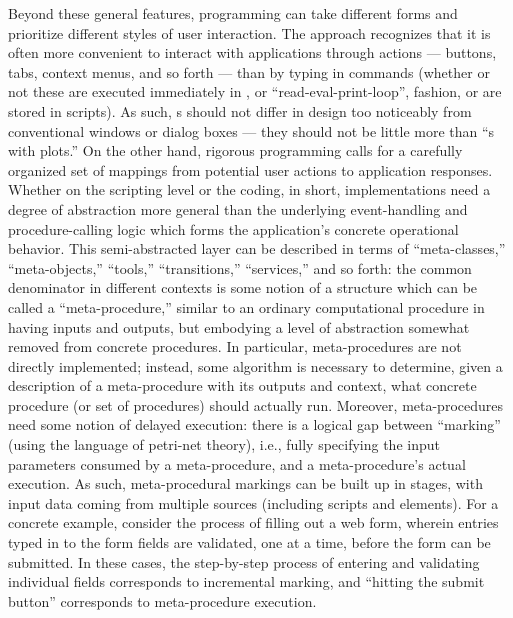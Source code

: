 \documentclass[11pt,letterpaper]{article}
\newcommand{\ATextCClr}[1]{\textcolor{atcColor}{\textbf{#1}}}
\newcommand{\IDN}{\resizebox{!}{7pt}{\AcronymText{IDN}}}
\newcommand{\REPL}{\resizebox{!}{7pt}{\AcronymText{REPL}}}
\newcommand{\MdsX}{\resizebox{!}{7.5pt}{\ATextCClr{MdsX}}}
\newcommand{\GUI}{\resizebox{!}{7pt}{\AcronymText{GUI}}}
\newcommand{\textscc}[1]{{\color{orr!35!black}{{%
						\fontfamily{Cabin-TLF}\fontseries{b}\selectfont{\textsc{\scriptsize{#1}}}}}}}
\newcommand{\AcronymText}[1]{{\textscc{#1}}}
\newcommand{\p}[1]{

\vspace{1em}#1}
\newcommand{\q}[1]{{\fontfamily{qcr}\selectfont ``}#1{\fontfamily{qcr}\selectfont ''}}
\begin{document}
{\p{Beyond these general features, \IDN{} 
programming can take different forms and 
prioritize different styles of user 
interaction.  The \MdsX{} approach recognizes 
that it is often more convenient to 
interact with applications through 
\GUI{} actions --- buttons, tabs, context 
menus, and so forth --- than by typing 
in commands (whether or not these are 
executed immediately in \REPL{}, or 
\q{read-eval-print-loop}, fashion, or are 
stored in scripts).  As such, \IDN{}s 
should not differ in design too noticeably 
from conventional \GUI{} windows or dialog 
boxes --- they should not be little more 
than \q{\REPL{}s with plots.}  On the other 
hand, rigorous \GUI{} programming 
calls for a carefully organized 
set of mappings from potential user 
actions to application responses.  
Whether on the scripting level or 
the \GUI{} coding, in short, 
implementations need a degree of abstraction 
more general than the underlying event-handling 
and procedure-calling logic which forms 
the application's concrete operational 
behavior.  This semi-abstracted layer 
can be described in terms of \q{meta-classes,} 
\q{meta-objects,} \q{tools,} \q{transitions,} 
\q{services,} and so forth: the common 
denominator in different contexts is some 
notion of a structure which can be called 
a \q{meta-procedure,} similar to an ordinary 
computational procedure in having inputs and 
outputs, but embodying a level of abstraction 
somewhat removed from concrete procedures.  
In particular, meta-procedures are not 
directly implemented; instead, some algorithm 
is necessary to determine, given a description 
of a meta-procedure with its outputs and 
context, what concrete procedure (or set of 
procedures) should actually run.  Moreover, 
meta-procedures need some notion of delayed 
execution: there is a logical gap between 
\q{marking} (using the language of petri-net 
theory), i.e., fully specifying the input 
parameters consumed by a meta-procedure, and a 
meta-procedure's actual execution.  
As such, meta-procedural markings can be 
built up in stages, with input data coming 
from multiple sources (including scripts and 
\GUI{} elements).  For a concrete example, 
consider the process of filling out a web 
form, wherein entries typed in to the form 
fields are validated, one at a time, 
before the form can be submitted.  
In these cases, the step-by-step process of 
entering and validating individual fields 
corresponds to incremental marking, and 
\q{hitting the submit button} corresponds 
to meta-procedure execution.}

}
\end{document}

